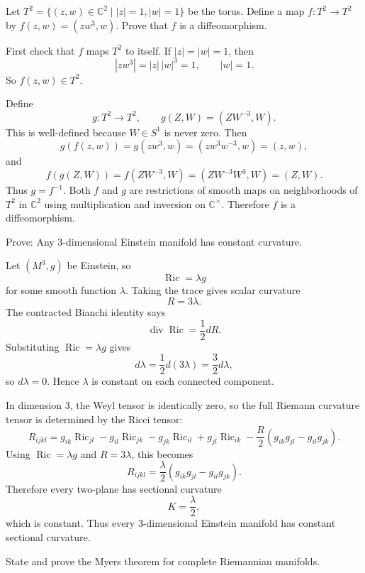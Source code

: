 \begin{exercise}
\label{geometry:2013:9}
Let $T^2 = \{(z, w) \in \mathbb{C}^2 \mid |z| = 1, |w| = 1\}$ be the torus. Define a map $f : T^2 \to T^2$ by $f(z, w) = (zw^3, w)$. Prove that $f$ is a diffeomorphism.
\end{exercise}

\begin{solution}
First check that $f$ maps $T^2$ to itself. If $|z|=|w|=1$, then
\[
|zw^3|=|z|\,|w|^3=1,\qquad |w|=1.
\]
So $f(z,w)\in T^2$.

Define
\[
g:T^2\to T^2,\qquad g(Z,W)=(ZW^{-3},W).
\]
This is well-defined because $W\in S^1$ is never zero. Then
\[
g(f(z,w))=g(zw^3,w)=(zw^3w^{-3},w)=(z,w),
\]
and
\[
f(g(Z,W))=f(ZW^{-3},W)=(ZW^{-3}W^3,W)=(Z,W).
\]
Thus $g=f^{-1}$. Both $f$ and $g$ are restrictions of smooth maps on neighborhoods of $T^2$ in $\mathbb{C}^2$ using multiplication and inversion on $\mathbb{C}^{\times}$. Therefore $f$ is a diffeomorphism.
\end{solution}

\begin{exercise}
\label{geometry:2013:10}
Prove: Any 3-dimensional Einstein manifold has constant curvature.
\end{exercise}

\begin{solution}
Let $(M^3,g)$ be Einstein, so
\[
\operatorname{Ric}=\lambda g
\]
for some smooth function $\lambda$. Taking the trace gives scalar curvature
\[
R=3\lambda.
\]
The contracted Bianchi identity says
\[
\operatorname{div}\operatorname{Ric}=\frac{1}{2}dR.
\]
Substituting $\operatorname{Ric}=\lambda g$ gives
\[
d\lambda=\frac{1}{2}d(3\lambda)=\frac{3}{2}d\lambda,
\]
so $d\lambda=0$. Hence $\lambda$ is constant on each connected component.

In dimension $3$, the Weyl tensor is identically zero, so the full Riemann curvature tensor is determined by the Ricci tensor:
\[
R_{ijkl}
=g_{ik}\operatorname{Ric}_{jl}-g_{il}\operatorname{Ric}_{jk}
-g_{jk}\operatorname{Ric}_{il}+g_{jl}\operatorname{Ric}_{ik}
-\frac{R}{2}(g_{ik}g_{jl}-g_{il}g_{jk}).
\]
Using $\operatorname{Ric}=\lambda g$ and $R=3\lambda$, this becomes
\[
R_{ijkl}
=\frac{\lambda}{2}(g_{ik}g_{jl}-g_{il}g_{jk}).
\]
Therefore every two-plane has sectional curvature
\[
K=\frac{\lambda}{2},
\]
which is constant. Thus every $3$-dimensional Einstein manifold has constant sectional curvature.
\end{solution}

\begin{exercise}
\label{geometry:2013:11}
State and prove the Myers theorem for complete Riemannian manifolds.
\end{exercise}

